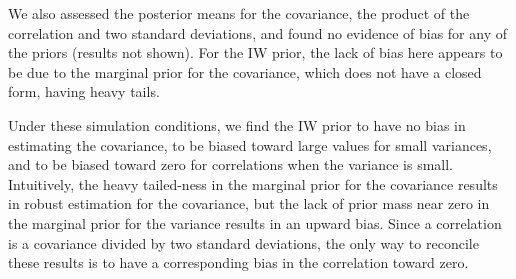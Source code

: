 \documentclass[12pt]{article}
\begin{document}

We also assessed the posterior means for the covariance, the product of the correlation and two standard deviations, and found no evidence of bias for any of the priors (results not shown). For the IW prior, the lack of bias here appears to be due to the marginal prior for the covariance, which does not have a closed form, having heavy tails. 

Under these simulation conditions, we find the IW prior to have no bias in estimating the covariance, to be biased toward large values for small variances, and to be biased toward zero for correlations when the variance is small. Intuitively, the heavy tailed-ness in the marginal prior for the covariance results in robust estimation for the covariance, but the lack of prior mass near zero in the marginal prior for the variance results in an upward bias. Since a correlation is a covariance divided by two standard deviations, the only way to reconcile these results is to have a corresponding bias in the correlation toward zero.
\end{document}
